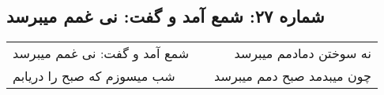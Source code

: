 \begin{center}
\section*{شماره ۲۷: شمع آمد و گفت: نی غمم میبرسد}
\label{sec:027}
\begin{longtable}{l p{0.5cm} r}
شمع آمد و گفت: نی غمم میبرسد
&&
نه سوختن دمادمم میبرسد
\\
شب میسوزم که صبح را دریابم
&&
چون میبدمد صبح دمم میبرسد
\\
\end{longtable}
\end{center}
